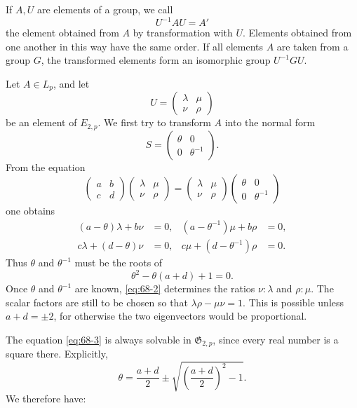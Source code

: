 \documentclass[11pt,a4paper]{article}
\begin{document}
If \(A,U\) are elements of a group, we call
\[
 U^{-1}AU=A'
\]
the element obtained from \(A\) by transformation with \(U\).  Elements obtained from one another in this way have the same order.  If all elements \(A\) are taken from a group \(G\), the transformed elements form an isomorphic group \(U^{-1}GU\).

Let \(A\in L_p\), and let
\[
 U=\begin{pmatrix}\lambda&\mu\\\nu&\rho\end{pmatrix}
\]
be an element of \(E_{2,p}\).  We first try to transform \(A\) into the normal form
\begin{equation}\label{eq:68-1}
 S=\begin{pmatrix}\theta&0\\0&\theta^{-1}\end{pmatrix}.
\end{equation}
From the equation
\[
 \begin{pmatrix}a&b\\c&d\end{pmatrix}
 \begin{pmatrix}\lambda&\mu\\\nu&\rho\end{pmatrix}
 =
 \begin{pmatrix}\lambda&\mu\\\nu&\rho\end{pmatrix}
 \begin{pmatrix}\theta&0\\0&\theta^{-1}\end{pmatrix}
\]
one obtains
\begin{align}
 (a-\theta)\lambda+b\nu&=0,
 &(a-\theta^{-1})\mu+b\rho&=0,\nonumber\\
 c\lambda+(d-\theta)\nu&=0,
 &c\mu+(d-\theta^{-1})\rho&=0.\label{eq:68-2}
\end{align}
Thus \(\theta\) and \(\theta^{-1}\) must be the roots of
\begin{equation}\label{eq:68-3}
 \theta^2-\theta(a+d)+1=0.
\end{equation}
Once \(\theta\) and \(\theta^{-1}\) are known, \eqref{eq:68-2} determines the ratios \(\nu:\lambda\) and \(\rho:\mu\).  The scalar factors are still to be chosen so that \(\lambda\rho-\mu\nu=1\).  This is possible unless \(a+d=\pm2\), for otherwise the two eigenvectors would be proportional.

The equation \eqref{eq:68-3} is always solvable in \(\mathfrak G_{2,p}\), since every real number is a square there.  Explicitly,
\begin{equation}\label{eq:68-5}
 \theta=\frac{a+d}{2}\pm\sqrt{\left(\frac{a+d}{2}\right)^2-1}.
\end{equation}
We therefore have:
\end{document}
